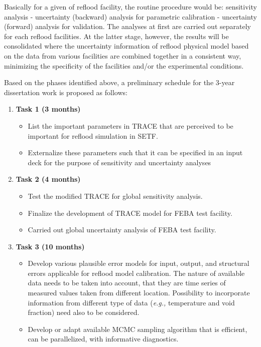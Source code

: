 \documentclass[11pt,titlepage]{article}
\begin{document}
Basically for a given of reflood facility, the routine procedure would be: sensitivity analysis - uncertainty (backward) analysis for parametric calibration - uncertainty (forward) analysis for validation. The analyses at first are carried out separately for each reflood facilities. 
At the latter stage, however, the results will be consolidated where the uncertainty information of reflood physical model based on the data from various facilities are combined together in a consistent way, minimizing the specificity of the facilities and/or the experimental conditions.

Based on the phases identified above, a preliminary schedule for the 3-year dissertation work is proposed as follows:

\begin{enumerate}
    \item \textbf{Task 1 (3 months)}
        \begin{itemize}
            \item List the important parameters in TRACE that are perceived to be important for reflood simulation in SETF.
            \item Externalize these parameters such that it can be specified in an input deck for the purpose of sensitivity and uncertainty analyses 
        \end{itemize}
    \item \textbf{Task 2 (4 months)}
        \begin{itemize}
            \item Test the modified TRACE for global sensitivity analysis.
            \item Finalize the development of TRACE model for FEBA test facility.
            \item Carried out global uncertainty analysis of FEBA test facility.
        \end{itemize}
   \item \textbf{Task 3 (10 months)}
        \begin{itemize}
            \item Develop various plausible error models for input, output, and structural errors applicable for reflood model calibration. 
            The nature of available data needs to be taken into account, that they are time series of measured values taken from different location. 
            Possibility to incorporate information from different type of data (\textit{e.g.,} temperature and void fraction) need also to be considered.   
            \item Develop or adapt available MCMC sampling algorithm that is efficient, can be parallelized, with informative diagnostics. 

\end{itemize}
\end{enumerate}
\end{document}

